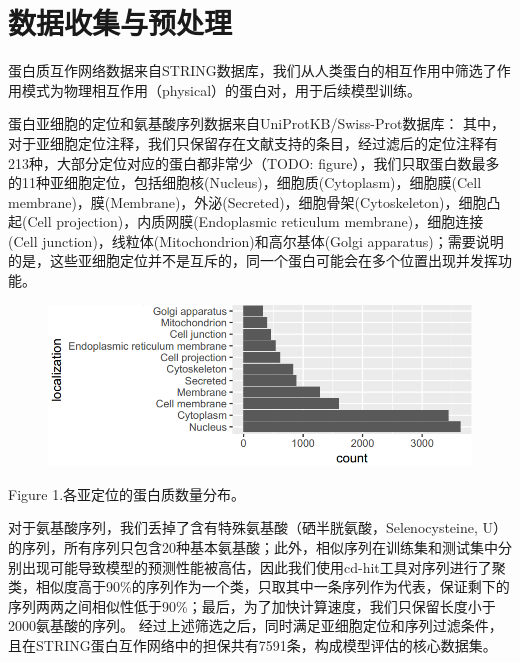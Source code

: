 \documentclass[a4paper,UTF8]{article}
\begin{document}
\section{数据收集与预处理}

蛋白质互作网络数据来自STRING数据库，我们从人类蛋白的相互作用中筛选了作用模式为物理相互作用（physical）的蛋白对，用于后续模型训练。

蛋白亚细胞的定位和氨基酸序列数据来自UniProtKB/Swiss-Prot数据库：
其中，对于亚细胞定位注释，我们只保留存在文献支持的条目，经过滤后的定位注释有213种，大部分定位对应的蛋白都非常少（TODO: figure），我们只取蛋白数最多的11种亚细胞定位，包括细胞核(Nucleus)，细胞质(Cytoplasm)，细胞膜(Cell membrane)，膜(Membrane)，外泌(Secreted)，细胞骨架(Cytoskeleton)，细胞凸起(Cell projection)，内质网膜(Endoplasmic reticulum membrane)，细胞连接(Cell junction)，线粒体(Mitochondrion)和高尔基体(Golgi apparatus)；需要说明的是，这些亚细胞定位并不是互斥的，同一个蛋白可能会在多个位置出现并发挥功能。

\begin{figure}[H]
	\centering\includegraphics[scale=0.7]{../data/summary/loc.png}
\end{figure}
Figure 1.各亚定位的蛋白质数量分布。

对于氨基酸序列，我们丢掉了含有特殊氨基酸（硒半胱氨酸，Selenocysteine, U）的序列，所有序列只包含20种基本氨基酸；此外，相似序列在训练集和测试集中分别出现可能导致模型的预测性能被高估，因此我们使用cd-hit工具对序列进行了聚类，相似度高于90\%的序列作为一个类，只取其中一条序列作为代表，保证剩下的序列两两之间相似性低于90\%；最后，为了加快计算速度，我们只保留长度小于2000氨基酸的序列。
经过上述筛选之后，同时满足亚细胞定位和序列过滤条件，且在STRING蛋白互作网络中的担保共有7591条，构成模型评估的核心数据集。
\end{document}
